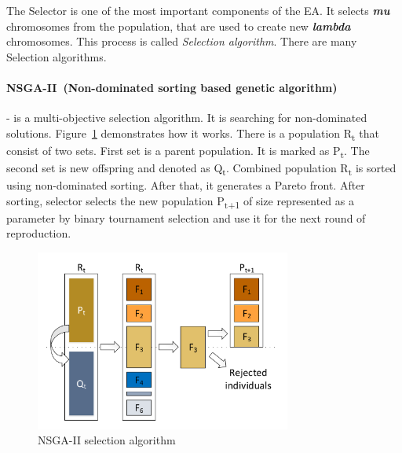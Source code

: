 The Selector is one of the most important components of the EA. It selects \textit{\textbf{mu}} chromosomes from the population, that are used to create new \textit{\textbf{lambda}} chromosomes. This process is called \textit{Selection algorithm}. There are many Selection algorithms.


\paragraph{NSGA-II~(Non-dominated sorting based genetic algorithm)~\cite{deb2000}} - is a multi-objective selection algorithm. It is searching for non-dominated solutions. Figure~\ref{fig:nsga2} demonstrates how it works. There is a population \texorpdfstring{R\textsubscript{t}}{R t} that consist of two sets. First set is a parent population. It is marked as \texorpdfstring{P\textsubscript{t}}{P t}. The second set is new offspring and denoted as \texorpdfstring{Q\textsubscript{t}}{Q t}. Combined population \texorpdfstring{R\textsubscript{t}}{R t} is sorted using non-dominated sorting. After that, it generates a Pareto front. After sorting, selector selects the new population \texorpdfstring{P\textsubscript{t+1}}{P t+1} of size represented as a parameter by binary tournament selection and use it for the next round of reproduction.

\begin{figure}
	\centering
	\includegraphics[width=0.75\textwidth]{images/nsga2.pdf}
	\caption[NSGA-II selection algorithm]{NSGA-II selection algorithm}
	\label{fig:nsga2}
\end{figure}

